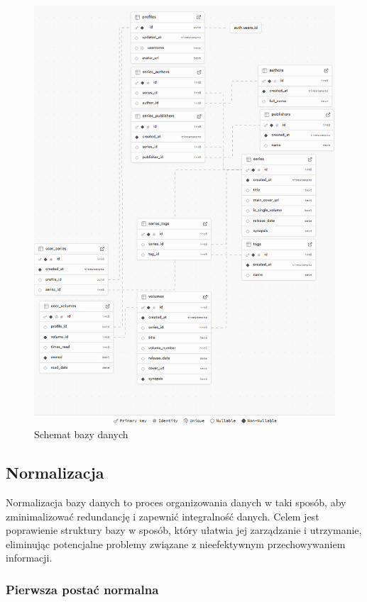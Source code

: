 \documentclass[12pt,twoside]{article}
\begin{document}
\begin{figure}[ht]
	\centering
	\includegraphics[width=1\textwidth]{figures/schematBazyDanych.png}
	\caption{Schemat bazy danych}
\label{Fig:schemat}
\end{figure}

\clearpage

\subsection{Normalizacja}

Normalizacja bazy danych to proces organizowania danych w taki sposób, aby zminimalizować redundancję i zapewnić 
integralność danych. Celem jest poprawienie struktury bazy w sposób, który ułatwia jej zarządzanie i utrzymanie, 
eliminując potencjalne problemy związane z nieefektywnym przechowywaniem informacji.

\subsubsection{Pierwsza postać normalna}
\end{document}
